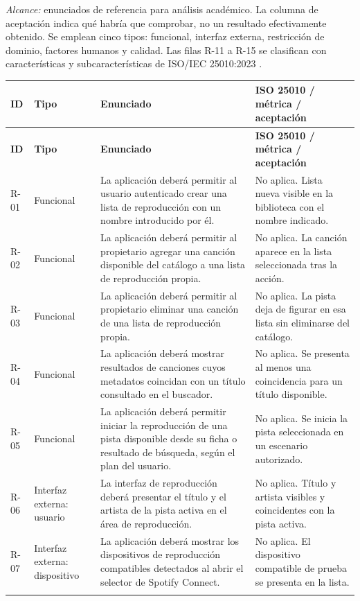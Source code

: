 \textit{Alcance:} enunciados de referencia para análisis académico. La columna de aceptación indica qué habría que comprobar, no un resultado efectivamente obtenido. Se emplean cinco tipos: funcional, interfaz externa, restricción de dominio, factores humanos y calidad. Las filas R-11 a R-15 se clasifican con características y subcaracterísticas de ISO/IEC 25010:2023 \cite{iso25010}.
\begingroup\scriptsize\renewcommand{\arraystretch}{1.09}
\begin{longtable}{@{}p{.065\linewidth}p{.14\linewidth}p{.44\linewidth}p{.29\linewidth}@{}}\toprule
\textbf{ID} & \textbf{Tipo} & \textbf{Enunciado} & \textbf{ISO 25010 / métrica / aceptación}\\\midrule\endfirsthead
\toprule\textbf{ID}&\textbf{Tipo}&\textbf{Enunciado}&\textbf{ISO 25010 / métrica / aceptación}\\\midrule\endhead
R-01 & Funcional & La aplicación deberá permitir al usuario autenticado crear una lista de reproducción con un nombre introducido por él. & No aplica. Lista nueva visible en la biblioteca con el nombre indicado.\\\addlinespace[0pt]
R-02 & Funcional & La aplicación deberá permitir al propietario agregar una canción disponible del catálogo a una lista de reproducción propia. & No aplica. La canción aparece en la lista seleccionada tras la acción.\\\addlinespace[0pt]
R-03 & Funcional & La aplicación deberá permitir al propietario eliminar una canción de una lista de reproducción propia. & No aplica. La pista deja de figurar en esa lista sin eliminarse del catálogo.\\\addlinespace[0pt]
R-04 & Funcional & La aplicación deberá mostrar resultados de canciones cuyos metadatos coincidan con un título consultado en el buscador. & No aplica. Se presenta al menos una coincidencia para un título disponible.\\\addlinespace[0pt]
R-05 & Funcional & La aplicación deberá permitir iniciar la reproducción de una pista disponible desde su ficha o resultado de búsqueda, según el plan del usuario. & No aplica. Se inicia la pista seleccionada en un escenario autorizado.\\\addlinespace[0pt]
R-06 & Interfaz externa: usuario & La interfaz de reproducción deberá presentar el título y el artista de la pista activa en el área de reproducción. & No aplica. Título y artista visibles y coincidentes con la pista activa.\\\addlinespace[0pt]
R-07 & Interfaz externa: dispositivo & La aplicación deberá mostrar los dispositivos de reproducción compatibles detectados al abrir el selector de Spotify Connect. & No aplica. El dispositivo compatible de prueba se presenta en la lista.\\\addlinespace[0pt]

\end{longtable}
